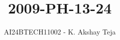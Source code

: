 \documentclass[journal,9pt,onecolumn]{IEEEtran}
\begin{document}

\vspace{3cm}
\title{2009-PH-13-24}
\author{AI24BTECH11002 - K. Akshay Teja}
\maketitle
 \bigskip
{\let\newpage\relax\maketitle}

\renewcommand{\thefigure}{\theenumi}
\renewcommand{\thetable}{\theenumi}
\setlength{\intextsep}{10pt} %

\renewcommand{\thetable}{\theenumi}
\end{document}
